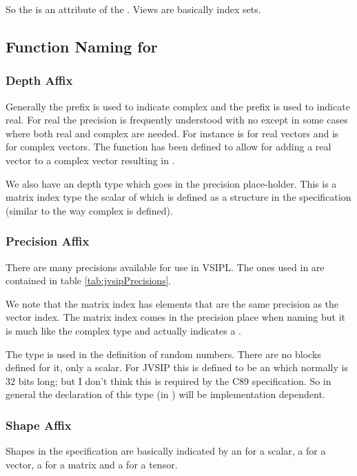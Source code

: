 So the  is an attribute of the . Views are basically index sets.
%
\subsection*{Function Naming for \cvl}
\subsubsection*{Depth Affix}
Generally the prefix  is used to indicate complex and the prefix  is used to indicate real. For real the precision is frequently understood with no  except in some cases where both real and complex are needed. For instance  is for real vectors and  is for complex vectors. The function  has been defined to allow for adding a real vector to a complex vector resulting in .

We also have an  depth type which goes in the precision place-holder. This is a matrix index type the scalar of which is defined as a structure in the \cvl{} specification (similar to the way complex is defined).
%
\subsubsection*{Precision Affix}
There are many precisions available for use in VSIPL. The ones used in \jv are contained in table \ref{tab:jvsipPrecisions}.  

We note that the matrix index has elements that are the same precision as the vector index. The matrix index comes in the precision place when naming but it is much like the complex type and actually indicates a .

The type  is used in the definition of  random numbers. There are no blocks defined for it, only a scalar.  For JVSIP this is defined to be an  which normally is 32 bits long; but I don't think this is required by the C89 specification. So in general the declaration of this type (in ) will be implementation dependent.

%
\subsubsection*{Shape Affix}
Shapes in the \cvl{} specification are basically indicated by an  for a scalar, a  for a vector, a  for a matrix and a  for a tensor.

